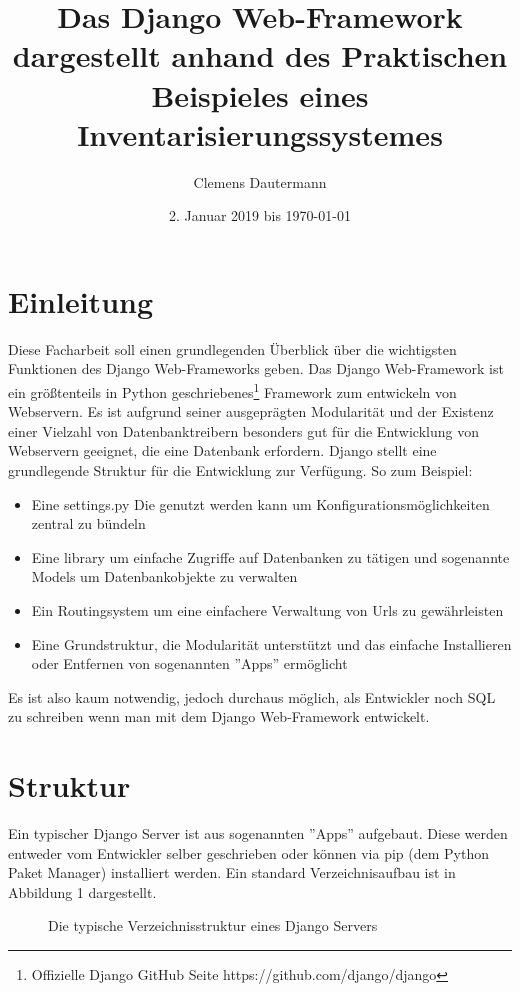 \documentclass{article}
\title{Das Django Web-Framework dargestellt anhand des Praktischen Beispieles eines Inventarisierungssystemes}
\author{Clemens Dautermann}
\date{2. Januar 2019 bis \today}
\begin{document}
\maketitle
\newpage
\tableofcontents
\newpage


\section{Einleitung}
Diese Facharbeit soll einen grundlegenden Überblick über die wichtigsten Funktionen des Django Web-Frameworks geben.\newline
Das Django Web-Framework ist ein größtenteils in Python geschriebenes\footnote{Offizielle Django GitHub Seite https://github.com/django/django} Framework
zum entwickeln von Webservern. Es ist aufgrund seiner ausgeprägten Modularität und der Existenz einer Vielzahl von Datenbanktreibern besonders gut für
die Entwicklung von Webservern geeignet, die eine Datenbank erfordern.\newline 
Django stellt eine grundlegende Struktur für die Entwicklung zur Verfügung. So zum Beispiel:
\begin{itemize}
	\item Eine settings.py Die genutzt werden kann um Konfigurationsmöglichkeiten zentral zu bündeln
	\item Eine library um einfache Zugriffe auf Datenbanken zu tätigen und sogenannte Models um Datenbankobjekte zu verwalten
	\item Ein Routingsystem um eine einfachere Verwaltung von Urls zu gewährleisten
	\item Eine Grundstruktur, die Modularität unterstützt und das einfache Installieren oder Entfernen von sogenannten ''Apps'' ermöglicht
\end{itemize}
Es ist also kaum notwendig, jedoch durchaus möglich, als Entwickler noch SQL zu schreiben wenn man mit dem Django Web-Framework entwickelt.
\section{Struktur}
Ein typischer Django Server ist aus sogenannten ''Apps'' aufgebaut. Diese werden entweder vom Entwickler selber geschrieben oder können via pip (dem Python Paket Manager) installiert werden. Ein standard Verzeichnisaufbau ist in Abbildung 1 dargestellt.
\begin{figure}[H]
	\caption{Die typische Verzeichnisstruktur eines Django Servers}
\end{figure}
\end{document}
